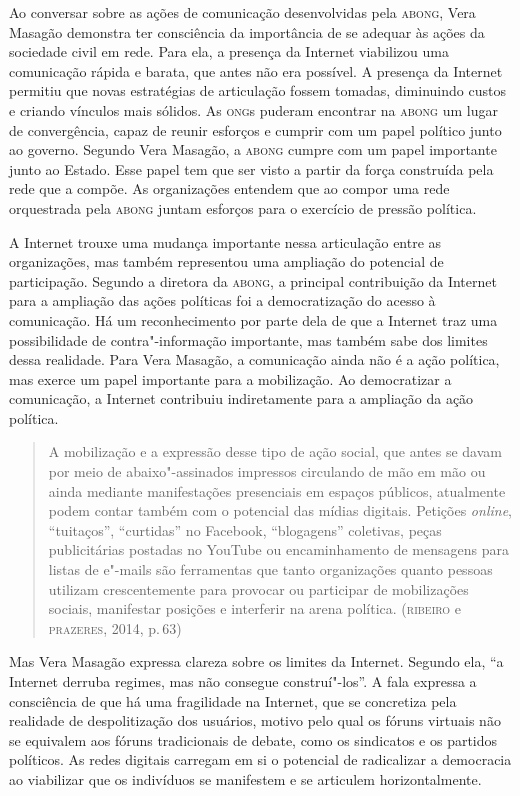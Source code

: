 Ao conversar sobre as ações de comunicação desenvolvidas pela \textsc{abong},
Vera Masagão demonstra ter consciência da importância de se adequar às
ações da sociedade civil em rede. Para ela, a presença da Internet
viabilizou uma comunicação rápida e barata, que antes não era possível.
A presença da Internet permitiu que novas estratégias de articulação
fossem tomadas, diminuindo custos e criando vínculos mais sólidos. As
\textsc{ong}s puderam encontrar na \textsc{abong} um lugar de convergência, capaz de
reunir esforços e cumprir com um papel político junto ao governo.
Segundo Vera Masagão, a \textsc{abong} cumpre com um papel importante junto ao
Estado. Esse papel tem que ser visto a partir da força construída pela
rede que a compõe. As organizações entendem que ao compor uma rede
orquestrada pela \textsc{abong} juntam esforços para o exercício de pressão
política.

A Internet trouxe uma mudança importante nessa articulação entre as
organizações, mas também representou uma ampliação do potencial de
participação. Segundo a diretora da \textsc{abong}, a principal contribuição da
Internet para a ampliação das ações políticas foi a democratização do
acesso à comunicação. Há um reconhecimento por parte dela de que a
Internet traz uma possibilidade de contra"-informação importante, mas
também sabe dos limites dessa realidade. Para Vera Masagão, a
comunicação ainda não é a ação política, mas exerce um papel importante
para a mobilização. Ao democratizar a comunicação, a Internet contribuiu
indiretamente para a ampliação da ação política.

\begin{quote}
A mobilização e a expressão desse tipo de ação social, que antes se
davam por meio de abaixo"-assinados impressos circulando de mão em mão ou
ainda mediante manifestações presenciais em espaços públicos, atualmente
podem contar também com o potencial das mídias digitais. Petições
\emph{online}, ``tuitaços'', ``curtidas'' no Facebook, ``blogagens''
coletivas, peças publicitárias postadas no YouTube ou encaminhamento de
mensagens para listas de e"-mails são ferramentas que tanto organizações
quanto pessoas utilizam crescentemente para provocar ou participar de
mobilizações sociais, manifestar posições e interferir na arena
política. (\textsc{ribeiro} e \textsc{prazeres}, 2014, p.\,63)
\end{quote}

Mas Vera Masagão expressa clareza sobre os limites da Internet. Segundo
ela, ``a Internet derruba regimes, mas não consegue construí"-los''. A
fala expressa a consciência de que há uma fragilidade na Internet, que
se concretiza pela realidade de despolitização dos usuários, motivo pelo
qual os fóruns virtuais não se equivalem aos fóruns tradicionais de
debate, como os sindicatos e os partidos políticos. As redes digitais
carregam em si o potencial de radicalizar a democracia ao viabilizar que
os indivíduos se manifestem e se articulem horizontalmente.

